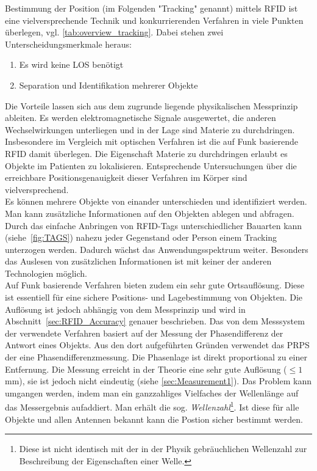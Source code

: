 Bestimmung der Position (im Folgenden "Tracking" genannt) mittels RFID ist eine vielversprechende Technik und konkurrierenden Verfahren in viele Punkten überlegen, vgl. \ref{tab:overview_tracking}. Dabei stehen zwei Unterscheidungsmerkmale heraus:
%
\begin{enumerate}
	\item Es wird keine LOS benötigt
	\item Separation und Identifikation mehrerer Objekte
\end{enumerate}
%
Die Vorteile lassen sich aus dem zugrunde liegende physikalischen Messprinzip ableiten. Es werden elektromagnetische Signale ausgewertet, die anderen Wechselwirkungen unterliegen und in der Lage sind Materie zu durchdringen. Insbesondere im Vergleich mit optischen Verfahren ist die auf Funk basierende RFID damit überlegen. Die Eigenschaft Materie zu durchdringen erlaubt es Objekte im Patienten zu lokalisieren. Entsprechende Untersuchungen über die erreichbare  Positionsgenauigkeit dieser Verfahren im Körper sind vielversprechend.~\cite{Knipscheer1}\\

Es können mehrere Objekte von einander unterschieden und identifiziert werden. Man kann zusätzliche Informationen auf den Objekten ablegen und abfragen. Durch das einfache Anbringen von RFID-Tags unterschiedlicher Bauarten kann (siehe~\ref{fig:TAGS}) nahezu jeder Gegenstand oder Person einem Tracking unterzogen werden. Dadurch wächst das Anwendungsspektrum weiter. Besonders das Auslesen von zusätzlichen Informationen ist mit keiner der anderen Technologien möglich.\\

Auf Funk basierende Verfahren bieten zudem ein sehr gute Ortsauflösung. Diese ist essentiell für eine sichere Positions- und Lagebestimmung von Objekten. Die Auflösung ist jedoch abhängig von dem Messprinzip und wird in Abschnitt~\ref{sec:RFID_Accuracy} genauer beschrieben. 
Das von dem Messsystem der \amedogmbh verwendete Verfahren basiert auf der Messung der Phasendifferenz der Antwort eines Objekts. Aus den dort aufgeführten Gründen verwendet das PRPS der \amedogmbh eine Phasendifferenzmessung. Die Phasenlage ist direkt proportional zu einer Entfernung. Die Messung erreicht in der Theorie eine sehr gute Auflösung ($\leq 1$ mm), sie ist jedoch nicht eindeutig (siehe \ref{sec:Measurement1}). Das Problem kann umgangen werden, indem man ein ganzzahliges Vielfaches der Wellenlänge auf das Messergebnis aufaddiert. Man erhält die sog. \textit{Wellenzahl}\footnote{Diese ist nicht identisch mit der in der Physik gebräuchlichen Wellenzahl zur Beschreibung der Eigenschaften einer Welle.}. Ist diese für alle Objekte und allen Antennen bekannt kann die Postion sicher bestimmt werden.\\

